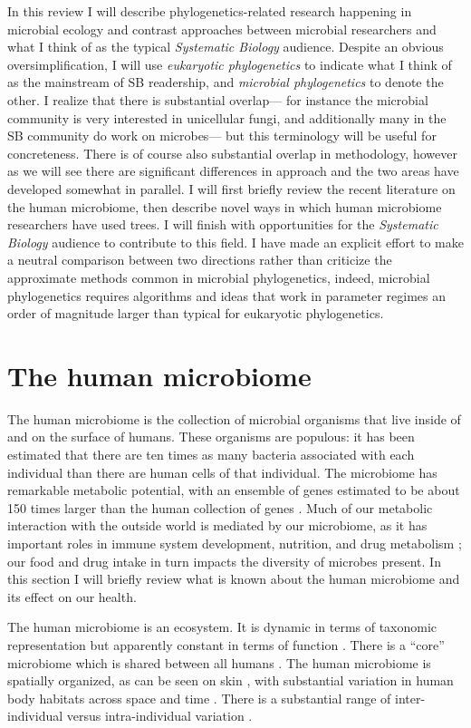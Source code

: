 \documentclass{amsart}
\begin{document}
In this review I will describe phylogenetics-related research happening in microbial ecology and contrast approaches between microbial researchers and what I think of as the typical \emph{Systematic Biology} audience.
Despite an obvious oversimplification, I will use \textit{eukaryotic phylogenetics} to indicate what I think of as the mainstream of SB readership, and \textit{microbial phylogenetics} to denote the other.
I realize that there is substantial overlap--- for instance the microbial community is very interested in unicellular fungi, and additionally many in the SB community do work on microbes--- but this terminology will be useful for concreteness.
There is of course also substantial overlap in methodology, however as we will see there are significant differences in approach and the two areas have developed somewhat in parallel.
I will first briefly review the recent literature on the human microbiome, then describe novel ways in which human microbiome researchers have used trees.
I will finish with opportunities for the \textit{Systematic Biology} audience to contribute to this field.
I have made an explicit effort to make a neutral comparison between two directions rather than criticize the approximate methods common in microbial phylogenetics, indeed, microbial phylogenetics requires algorithms and ideas that work in parameter regimes an order of magnitude larger than typical for eukaryotic phylogenetics.

\section{The human microbiome}
The human microbiome is the collection of microbial organisms that live inside of and on the surface of humans.
These organisms are populous: it has been estimated that there are ten times as many bacteria associated with each individual than there are human cells of that individual.
The microbiome has remarkable metabolic potential, with an ensemble of genes estimated to be about 150 times larger than the human collection of genes \citep{qin2010human}.
Much of our metabolic interaction with the outside world is mediated by our microbiome, as it has important roles in immune system development, nutrition, and drug metabolism \citep{kau2011human,maurice2013xenobiotics}; our food and drug intake in turn impacts the diversity of microbes present.
In this section I will briefly review what is known about the human microbiome and its effect on our health.

The human microbiome is an ecosystem.
It is dynamic in terms of taxonomic representation but apparently constant in terms of function \citep{hmp2012structure}.
There is a ``core'' microbiome which is shared between all humans \citep{turnbaugh2008core}.
The human microbiome is spatially organized, as can be seen on skin \citep{grice2009topographical}, with substantial variation in human body habitats across space and time \citep{costello2009bacterial}.
There is a substantial range of inter-individual versus intra-individual variation \citep{hmp2012structure}.
\end{document}
